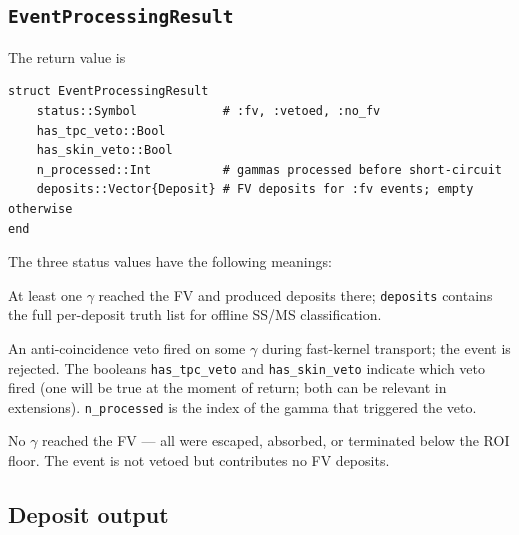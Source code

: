 \documentclass[11pt]{article}
\begin{document}
\subsection{\texttt{EventProcessingResult}}
\label{sec:event-result}

The return value is
\begin{verbatim}
struct EventProcessingResult
    status::Symbol            # :fv, :vetoed, :no_fv
    has_tpc_veto::Bool
    has_skin_veto::Bool
    n_processed::Int          # gammas processed before short-circuit
    deposits::Vector{Deposit} # FV deposits for :fv events; empty otherwise
end
\end{verbatim}

The three status values have the following meanings:

\begin{description}[leftmargin=2.0cm,style=nextline]
\item[\texttt{:fv}] At least one $\gamma$ reached the FV and produced
deposits there; \texttt{deposits} contains the full per-deposit truth list
for offline SS/MS classification.
\item[\texttt{:vetoed}] An anti-coincidence veto fired on some $\gamma$
during fast-kernel transport; the event is rejected. The booleans
\texttt{has\_tpc\_veto} and \texttt{has\_skin\_veto} indicate which veto
fired (one will be true at the moment of return; both can be relevant in
extensions). \texttt{n\_processed} is the index of the gamma that triggered
the veto.
\item[\texttt{:no\_fv}] No $\gamma$ reached the FV --- all were escaped,
absorbed, or terminated below the ROI floor. The event is not vetoed but
contributes no FV deposits.
\end{description}

\subsection{Deposit output}
\label{sec:event-output}
\end{document}
